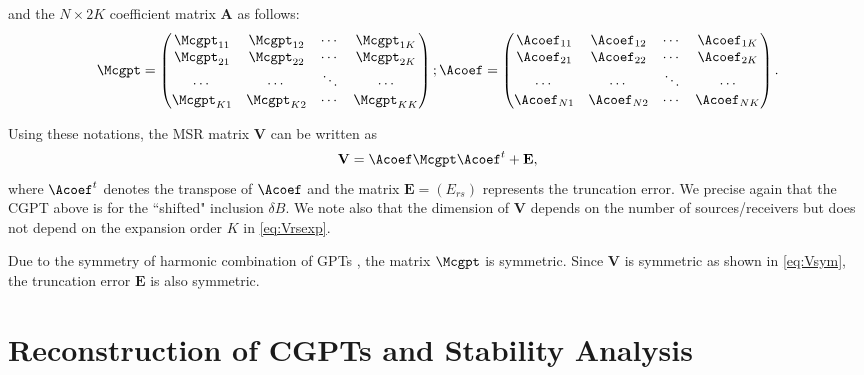 and the $N \times 2K$ coefficient matrix $\mathbf{A}$ as follows:
\begin{equation}
\Mcgpt = \begin{pmatrix}
\Mcgpt_{11} & \Mcgpt_{12} & \cdots & \Mcgpt_{1K}\\
\Mcgpt_{21} & \Mcgpt_{22} & \cdots & \Mcgpt_{2K}\\
\cdots & \cdots & \ddots & \cdots\\
\Mcgpt_{K1} & \Mcgpt_{K2} & \cdots & \Mcgpt_{KK}
\end{pmatrix};
\Acoef = \begin{pmatrix}
\Acoef_{11} & \Acoef_{12} & \cdots & \Acoef_{1K}\\
\Acoef_{21} & \Acoef_{22} & \cdots & \Acoef_{2K}\\
\cdots & \cdots & \ddots & \cdots\\
\Acoef_{N1} & \Acoef_{N2} & \cdots & \Acoef_{NK}
\end{pmatrix}.
\label{eq:Mcgpt}
\end{equation}


Using these notations, the MSR matrix $\mathbf{V}$ can be written
as
\begin{equation}
\mathbf{V} = \Acoef  \Mcgpt \Acoef^t+ \mathbf{E}, \label{eq:Vexp}
\end{equation}
where $\Acoef^t$ denotes the transpose of $\Acoef$ and the matrix
$\mathbf{E} = (E_{rs})$ represents the truncation error. We
precise again that the CGPT above is for the ``shifted" inclusion
$\delta B$. We note also that the dimension of $\mathbf{V}$
depends on the number of sources/receivers but does not depend on
the expansion order $K$ in \eqref{eq:Vrsexp}.

Due to the symmetry of harmonic combination of GPTs
\cite{ammari2007polarization}, the matrix $\Mcgpt$ is symmetric.
Since $\mathbf{V}$ is symmetric as shown in \eqref{eq:Vsym}, the
truncation error $\mathbf{E}$ is also symmetric.

\section{Reconstruction of CGPTs and Stability Analysis}\label{sec:reconstr-cgpt-stab}


